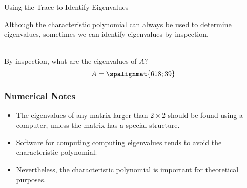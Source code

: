 \begin{frame}{Using the Trace to Identify Eigenvalues}

    Although the characteristic polynomial can always be used to determine eigenvalues, sometimes we can identify eigenvalues by inspection.
    
    \vspace{12pt}
    
     \\ By inspection, what are the eigenvalues of $A$? 
    $$A = \spalignmat{6 18;3 9}$$

    

\end{frame}




\begin{frame}\frametitle{Numerical Notes}

    \begin{itemize}
        
        \item The eigenvalues of any matrix larger than $2\times2$ should be found using a computer, unless the matrix has a special structure.
        
        \item Software for computing computing eigenvalues tends to avoid the characteristic polynomial.
        
        \item Nevertheless, the characteristic polynomial is important for theoretical purposes. 
    
    \end{itemize}
\end{frame}













